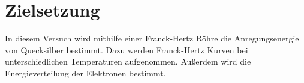 \section{Zielsetzung}
\label{sec:Zielsetzung}

In diesem Versuch wird mithilfe einer Franck-Hertz Röhre die Anregungsenergie 
von Quecksilber bestimmt. Dazu werden Franck-Hertz Kurven bei unterschiedlichen
Temperaturen aufgenommen. Außerdem wird die Energieverteilung der Elektronen 
bestimmt.